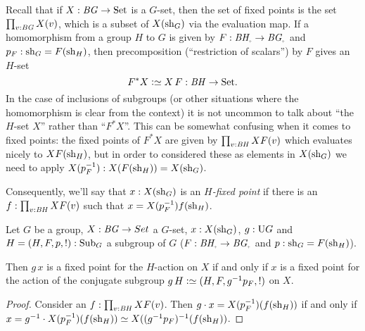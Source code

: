 Recall that if $X:\mathit{B}\mathit{G}\to\mathrm{Set}$ is a $G$-set, then the set of fixed points is the set $\prod_{v:\mathit{B}\mathit{G}}X(v)$, which is a subset of $X(\mathrm{sh}_G)$ via the evaluation map.  If a homomorphism from a group $H$ to $G$ is given by $F:\BH_\div\to \BG_\div$ and $p_F:\mathrm{sh}_G=F(\mathrm{sh}_H)$, then precomposition (``restriction of scalars'') by $F$ gives an $H$-set
$$F^*X\defequi X\,F:\BH\to\Set.$$
In the case of inclusions of subgroups (or other situations where the homomorphism is clear from the context) it is not uncommon to talk about ``the $H$-set $X$'' rather than ``$F^*X$''.
This can be somewhat confusing when it comes to fixed points: the fixed points of $F^*X$ are given by $\prod_{v:\mathit{B}\mathit{H}}XF(v)$ which evaluates nicely to $XF(\mathrm{sh}_H)$, but in order to considered  these as elements in $X(\mathrm{sh}_G)$ we need to apply $X(p_F^{-1}):X(F(\mathrm{sh}_H))=X(\mathrm{sh}_G)$.

Consequently, we'll say that $x:X(\mathrm{sh}_G)$ is an \emph{$H$-fixed point} if there is an $f:\prod_{v:\mathit{B}\mathit{H}}XF(v)$ such that $x=X(p_F^{-1})f(\mathrm{sh}_H)$.



\begin{lemma}
  \label{lem:thereisaconjugate}
  Let $G$ be a group, $X:\mathit{B}\mathit{G}\to Set$ a $G$-set, $x:X(\mathrm{sh}_G)$, $g:\mathrm{U} G$ and $H=(H,F,p,!):\mathrm{Sub}_G$ a subgroup of $G$ ($F:\BH_\div\to \BG_\div$ and $p:\mathrm{sh}_G=F(\mathrm{sh}_H)$).

Then $g\,x$ is a fixed point for the $H$-action on $X$ if and only if $x$ is a fixed point for the action  of the conjugate subgroup $g\,H\defequi(H,F,g^{-1}p_F,!)$ on $X$.
\end{lemma}
\begin{proof}
  Consider an $f:\prod_{v:\mathit{B}\mathit{H}}XF(v)$.  Then $g\cdot x=X(p_F^{-1})(f(\mathrm{sh}_H))$ if and only if $x=g^{-1}\cdot X(p_F^{-1})(f(\sh_H))\oldequiv X((g^{-1}p_F)^{-1}(f(\sh_H))$.
\end{proof}




